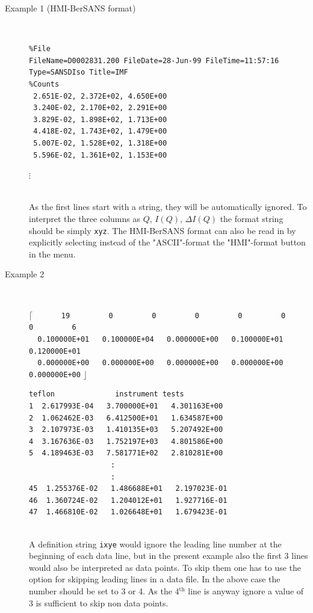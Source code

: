\begin{description}
\item[Example 1 (HMI-BerSANS format)] ~\\
{\tiny
\begin{verbatim}
%File
FileName=D0002831.200 FileDate=28-Jun-99 FileTime=11:57:16
Type=SANSDIso Title=IMF
%Counts
 2.651E-02, 2.372E+02, 4.650E+00
 3.240E-02, 2.170E+02, 2.291E+00
 3.829E-02, 1.898E+02, 1.713E+00
 4.418E-02, 1.743E+02, 1.479E+00
 5.007E-02, 1.528E+02, 1.318E+00
 5.596E-02, 1.361E+02, 1.153E+00
\end{verbatim}
} \centerline{$\vdots$ \hspace{5cm} ~}
~\\
As the first lines start with a string, they will be automatically
ignored. To interpret the three columns as $Q$, $I(Q)$, $\Delta
I(Q)$ the format string should be simply {\tt xyz}. The HMI-BerSANS
format can also be read in by explicitly selecting instead of the
"ASCII"-format
the "HMI"-format button in the menu. \\[1cm]

\item[Example 2] \hspace{1pt}\\
{\tiny
\textcolor[rgb]{0.98,0.00,0.00}{$\mathbf{\lceil}$}
\verb"      19         0         0         0         0         0         0         6"\\
\verb"  0.100000E+01   0.100000E+04   0.000000E+00   0.100000E+01   0.120000E+01"\\
\verb"  0.000000E+00   0.000000E+00   0.000000E+00   0.000000E+00   0.000000E+00"
\textcolor[rgb]{0.98,0.00,0.00}{$\mathbf{\rfloor}$}
\begin{verbatim}
teflon              instrument tests
1  2.617993E-04   3.700000E+01   4.301163E+00
2  1.062462E-03   6.412500E+01   1.634587E+00
3  2.107973E-03   1.410135E+03   5.207492E+00
4  3.167636E-03   1.752197E+03   4.801586E+00
5  4.189463E-03   7.581771E+02   2.810281E+00
                   :
                   :
45  1.255376E-02   1.486688E+01   2.197023E-01
46  1.360724E-02   1.204012E+01   1.927716E-01
47  1.466810E-02   1.026648E+01   1.679423E-01
\end{verbatim}
}
~\\
A definition string {\tt ixye} would ignore the leading line number
at the beginning of each data line, but in the present example also
the first 3 lines would also be interpreted as data points. To skip
them one has to use the option for skipping leading lines in a data
file. In the above case the number should be set to 3 or 4. As the
4$^\text{th}$ line is anyway ignore a value of 3 is sufficient to
skip non data points.
\\[1cm]


\end{description}
